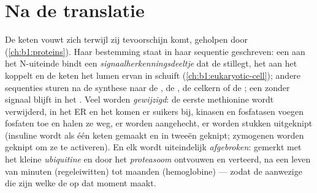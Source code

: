 \section{Na de translatie}

\begin{proposition}\label{prop:b1:gene-expression:after}
De keten vouwt zich terwijl zij tevoorschijn komt, geholpen door 
(\cref{ch:b1:proteins}). Haar bestemming staat in haar sequentie geschreven: een
\emph{} aan het N-uiteinde bindt een
\emph{signaalherkenningsdeeltje} dat de  stillegt, het  aan het
 koppelt en de keten het lumen ervan in schuift
(\cref{ch:b1:eukaryotic-cell}); andere sequenties sturen  na de synthese
naar de , de , de celkern of de ; een 
zonder signaal blijft in het . Veel  worden \emph{gewijzigd}: de
eerste methionine wordt verwijderd, in het ER en het  komen er
suikers bij, kinasen en fosfatasen voegen fosfaten toe en halen ze weg, er worden
 aangehecht, er worden stukken uitgeknipt (insuline wordt als één keten
gemaakt en in tweeën geknipt; zymogenen worden geknipt om ze te activeren). En elk
 wordt uiteindelijk \emph{afgebroken}: gemerkt met het kleine 
\emph{ubiquitine} en door het \emph{proteasoom} ontvouwen en verteerd, na een leven
van minuten (regeleiwitten) tot maanden (hemoglobine) --- zodat de aanwezige
 die zijn welke de  op dat moment maakt.
\end{proposition}


